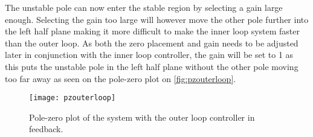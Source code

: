The unstable pole can now enter the stable region by selecting a gain large enough. Selecting the gain too large will however move the other pole further into the left half plane making it more difficult to make the inner loop system faster than the outer loop. As both the zero placement and gain needs to be adjusted later in conjunction with the inner loop controller, the gain will be set to 1 as this puts the unstable pole in the left half plane without the other pole moving too far away as seen on the pole-zero plot on \autoref{fig:pzouterloop}.

\begin{figure}[htbp]
\centering
\texttt{[image: pzouterloop]}
\caption{Pole-zero plot of the system with the outer loop controller in feedback.}
\label{fig:pzouterloop}
\end{figure}



